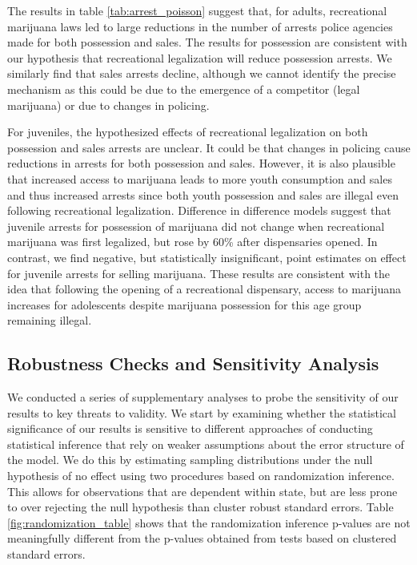 \documentclass[12pt]{article}%
\begin{document}
The results in table \ref{tab:arrest_poisson} suggest that, for adults, recreational marijuana laws led to large reductions in the number of arrests police agencies made for both possession and sales. 
The results for possession are consistent with our hypothesis that recreational legalization will reduce possession arrests. 
We similarly find that sales arrests decline, although we cannot  identify the precise mechanism as this could be due to the emergence of a competitor (legal marijuana) or due to changes in policing. 

For juveniles, the hypothesized effects of recreational legalization on both possession and sales arrests are unclear. 
It could be that changes in policing cause reductions in arrests for both possession and sales. However, it is also plausible that increased access to marijuana leads to more youth consumption and sales and thus increased arrests since both youth possession and sales are illegal even following recreational legalization.  
Difference in difference models suggest that juvenile arrests for possession of marijuana did not change when recreational marijuana was first legalized, but rose by 60\% after dispensaries opened. 
In contrast, we find negative, but statistically insignificant, point estimates on effect for juvenile arrests for selling marijuana.
These results are consistent with the idea that following the opening of a recreational dispensary, access to marijuana increases for adolescents despite marijuana possession for this age group remaining illegal. 

\subsection{Robustness Checks and Sensitivity Analysis}

We conducted a series of supplementary analyses to probe the sensitivity of our results to key threats to validity. 
We start by examining whether the statistical significance of our results is sensitive to different approaches of conducting statistical inference that rely on weaker assumptions about the error structure of the model. 
We do this by estimating sampling distributions under the null hypothesis of no effect using two procedures based on randomization inference. 
This allows for observations that are dependent within state, but are less prone to over rejecting the null hypothesis than cluster robust standard errors. 
Table \ref{fig:randomization_table} shows that the randomization inference p-values are not meaningfully different from the p-values obtained from tests based on clustered standard errors. 
\end{document}

